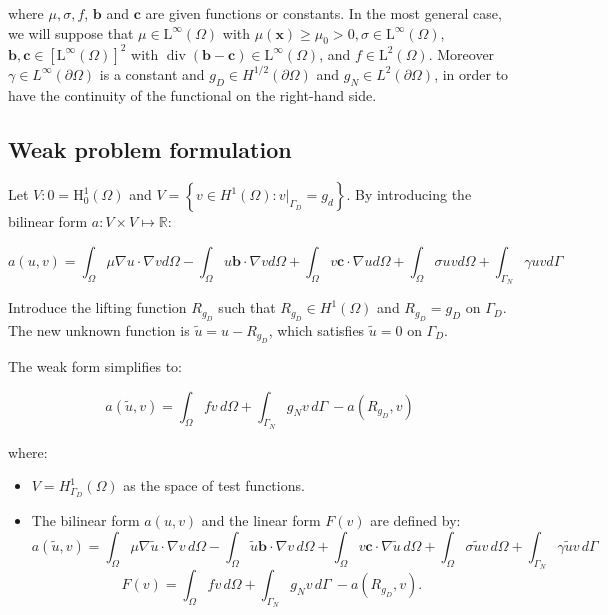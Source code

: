 \documentclass[11pt]{book}
\begin{document}
where $\mu, \sigma, f$, $\mathbf{b}$  and $\mathbf{c}$ are given functions or constants. In the most general case, we will suppose that $\mu \in \mathrm{L}^{\infty}(\Omega)$ with $\mu(\mathbf{x}) \geq \mu_{0}>0, \sigma \in \mathrm{L}^{\infty}(\Omega)$, $\mathbf{b}, \mathbf{c} \in\left[\mathrm{L}^{\infty}(\Omega)\right]^{2}$ with $\operatorname{div}(\mathbf{b}-\mathbf{c}) \in \mathrm{L}^{\infty}(\Omega)$, and $f \in \mathrm{L}^{2}(\Omega)$. Moreover $\gamma \in L^\infty(\partial \Omega)$ is a constant  and
$g_D \in H^{1/2}(\partial \Omega)$ and $g_N \in L^2(\partial \Omega)$,  in order to have the continuity of the functional on the right-hand side.






\subsection*{Weak problem formulation}

Let $V:0=\mathrm{H}_{0}^{1}(\Omega)$ and $V = \left\{ v \in H^1(\Omega) : v|_{\Gamma_D} = g_d \right\}
$. By introducing the bilinear form $a: V \times V \mapsto \mathbb{R}$:


\begin{equation}
a(u, v)=\int_{\Omega} \mu \nabla u \cdot \nabla v d \Omega-\int_{\Omega} u \mathbf{b} \cdot \nabla v d \Omega + \int_{\Omega} v\mathbf{c} \cdot \nabla u d\Omega  + \int_{\Omega} \sigma u v d \Omega + \int_{\Gamma_N} \gamma u v d\Gamma  
\end{equation}

Introduce the lifting function \( R_{g_D} \) such that \( R_{g_D} \in H^1(\Omega) \) and \( R_{g_D} = g_D \) on \( \Gamma_D \). The new unknown function is \( \tilde{u} = u - R_{g_D} \), which satisfies \( \tilde{u} = 0 \) on \( \Gamma_D \).


The weak form simplifies to:

\[
a(\tilde{u},v) = \int_{\Omega} fv \, d\Omega + \int_{\Gamma_N} g_N v \, d\Gamma \ - a(R_{g_D},v)
\]

where:
\begin{itemize}

\item \( V = H_{\Gamma_D}^1(\Omega) \) as the space of test functions.
\item The bilinear form \( a(u, v) \) and the linear form \( F(v) \) are defined by:
\[
a(\tilde{u}, v)=\int_{\Omega} \mu \nabla \tilde{u} \cdot \nabla v \, d \Omega - \int_{\Omega} \tilde{u} \mathbf{b} \cdot \nabla v \, d \Omega + \int_{\Omega} v\mathbf{c} \cdot \nabla \tilde{u} \, d\Omega + \int_{\Omega} \sigma \tilde{u} v \, d \Omega + \int_{\Gamma_N} \gamma \tilde{u} v \, d\Gamma
\]
  \[
  F(v) = \int_{\Omega} fv \, d\Omega + \int_{\Gamma_N} g_N v \, d\Gamma \ - a(R_{g_D},v).
  \]

  \end{itemize}
\end{document}
